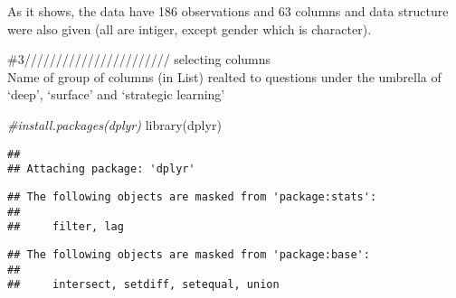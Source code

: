 \documentclass[
]{article}
\newenvironment{Shaded}{\begin{snugshade}}{\end{snugshade}}
\newcommand{\CommentTok}[1]{\textcolor[rgb]{0.56,0.35,0.01}{\textit{#1}}}
\newcommand{\FunctionTok}[1]{\textcolor[rgb]{0.00,0.00,0.00}{#1}}
\newcommand{\NormalTok}[1]{#1}
\begin{document}
As it shows, the data have 186 observations and 63 columns and data
structure were also given (all are intiger, except gender which is
character).

\#3/////////////////////// selecting columns\\
Name of group of columns (in List) realted to questions under the
umbrella of `deep', `surface' and `strategic learning'

\begin{Shaded}
\begin{Highlighting}[]
\CommentTok{\#install.packages(\textquotesingle{}dplyr\textquotesingle{})}
\FunctionTok{library}\NormalTok{(dplyr)}
\end{Highlighting}
\end{Shaded}

\begin{verbatim}
## 
## Attaching package: 'dplyr'
\end{verbatim}

\begin{verbatim}
## The following objects are masked from 'package:stats':
## 
##     filter, lag
\end{verbatim}

\begin{verbatim}
## The following objects are masked from 'package:base':
## 
##     intersect, setdiff, setequal, union
\end{verbatim}
\end{document}
